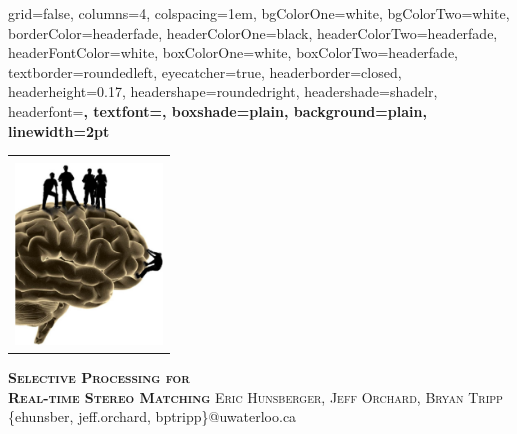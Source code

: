 \documentclass[landscape,final,a0paper,fontscale=0.285]{baposter}
\begin{document}



\begin{poster}%
  {
  grid=false,
  columns=4,
  colspacing=1em,
  bgColorOne=white,
  bgColorTwo=white,
  borderColor=headerfade,
  headerColorOne=black,
  headerColorTwo=headerfade,
  headerFontColor=white,
  boxColorOne=white,
  boxColorTwo=headerfade,
  textborder=roundedleft,
  eyecatcher=true,
  headerborder=closed,
  headerheight=0.17\textheight,
  headershape=roundedright,
  headershade=shadelr,
  headerfont=\Large\bf\textsc, %
  textfont={\setlength{\parindent}{1.5em}},
  boxshade=plain,
  background=plain,
  linewidth=2pt
  }
  {
    \begin{tabular}{c}
      \relax\\
      \includegraphics[height=13em]{brain.png}
    \end{tabular}
  }
  {
    \textbf{\textsc{Selective Processing for\\[0.2em] Real-time Stereo Matching}}\vspace{0.5em}
  }
  {
    \textsc{Eric Hunsberger, Jeff Orchard, Bryan Tripp}\\[0.2em]
    \{ehunsber, jeff.orchard, bptripp\}@uwaterloo.ca\\[0.4em]
}
\end{poster}
\end{document}
